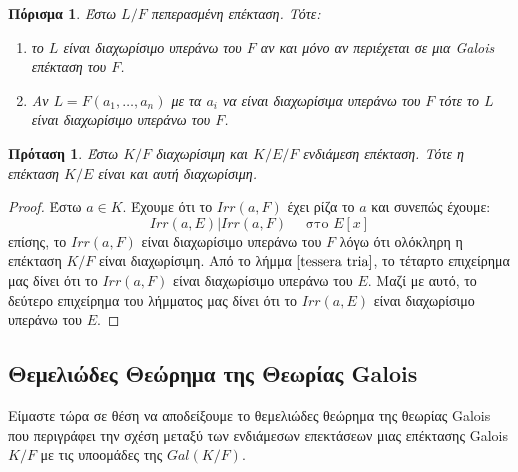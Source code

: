 \documentclass[oneside,a4paper]{article}
\newtheorem{prop}{Πρόταση}
\newtheorem{cor}{Πόρισμα}
\newcommand {\tl}{\textlatin}
\begin{document}
\begin{cor} Έστω $L/F$ πεπερασμένη επέκταση. Τότε:
	\begin{enumerate}
		\item το $L$ είναι διαχωρίσιμο υπεράνω του $F$ αν και μόνο αν περιέχεται σε μια \tl{Galois} επέκταση του $F$.
		\item Αν $L = F(a_1, \ldots , a_n)$ με τα $a_i$ να είναι διαχωρίσιμα υπεράνω του $F$ τότε το $L$ είναι διαχωρίσιμο υπεράνω του $F$.
	\end{enumerate}
\end{cor}

\begin{prop}
	\label{myprop}
	Έστω $K/F$ διαχωρίσιμη και $K/E/F$ ενδιάμεση επέκταση. Τότε η επέκταση $K/E$ είναι και αυτή διαχωρίσιμη.
\end{prop}
\begin{proof}
	Έστω $a \in K$. Έχουμε ότι το $Irr(a,F)$ έχει ρίζα το $a$ και συνεπώς έχουμε:
	$$Irr(a,E) | Irr(a,F) \quad \text{ στο } E[x]$$
	επίσης, το $Irr(a,F)$ είναι διαχωρίσιμο υπεράνω του $F$ λόγω ότι ολόκληρη η επέκταση $K/F$ είναι διαχωρίσιμη. Από το λήμμα $\ref{tessera tria}$, το τέταρτο επιχείρημα μας δίνει ότι το $Irr(a,F)$ είναι διαχωρίσιμο υπεράνω του $E$. Μαζί με αυτό, το δεύτερο επιχείρημα του λήμματος μας δίνει ότι το $Irr(a,E)$ είναι διαχωρίσιμο υπεράνω του $E$.
\end{proof}

\pagebreak
\subsection{Θεμελιώδες Θεώρημα της Θεωρίας \tl{Galois}}

Είμαστε τώρα σε θέση να αποδείξουμε το θεμελιώδες θεώρημα της θεωρίας \tl{Galois} που περιγράφει την σχέση μεταξύ των ενδιάμεσων επεκτάσεων μιας επέκτασης \tl{Galois} $K/F$ με τις υποομάδες της $Gal(K/F)$.
\end{document}
